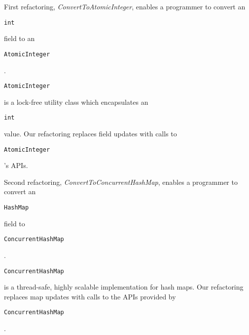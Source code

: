 \documentclass[10pt,preprint]{sigplanconf}
\newcommand\tool{{\smaller\textsc{Concurrencer}}\xspace}
\newcommand{\code}[1]{\begin{small}\texttt{#1}\end{small}}
\begin{document}
First refactoring, \emph{ConvertToAtomicInteger}, enables a programmer to
convert an \code{int} field to an \code{AtomicInteger}. \code{AtomicInteger} is
a lock-free utility class which encapsulates an \code{int} value. Our
refactoring replaces field updates with calls to \code{AtomicInteger}'s APIs.

 


Second refactoring, \emph{ConvertToConcurrentHashMap}, enables a programmer to
convert an \code{HashMap} field to \\
\code{ConcurrentHashMap}.
\code{ConcurrentHashMap} is a thread-safe, highly scalable implementation for
hash maps. Our refactoring replaces map updates with calls to the APIs provided
by \code{ConcurrentHashMap}.

\end{document}
